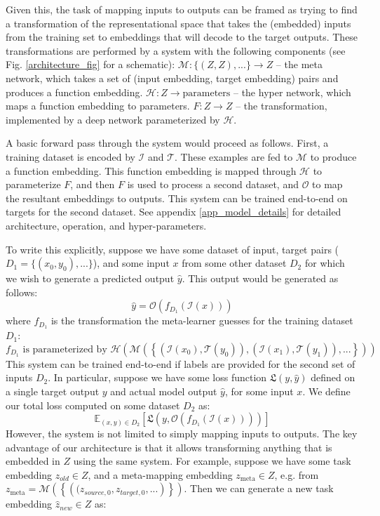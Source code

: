 \documentclass{article}
\begin{document}
Given this, the task of mapping inputs to outputs can be framed as trying to find a transformation of the representational space that takes the (embedded) inputs from the training set to embeddings that will decode to the target outputs. These transformations are performed by a system with the following components (see Fig. \ref{architecture_fig} for a schematic): $\mathcal{M}: \{(Z, Z), ...\} \rightarrow Z $ -- the meta network, which takes a set of (input embedding, target embedding) pairs and produces a function embedding. $\mathcal{H}: Z \rightarrow \text{parameters}$ -- the hyper network, which maps a function embedding to parameters. $F: Z \rightarrow Z$ -- the transformation, implemented by a deep network parameterized by $\mathcal{H}$. \par
A basic forward pass through the system would proceed as follows. First, a training dataset is encoded by $\mathcal{I}$ and $\mathcal{T}$. These examples are fed to $\mathcal{M}$ to produce a function embedding. This function embedding is mapped through $\mathcal{H}$ to parameterize $F$, and then $F$ is used to process a second dataset, and $\mathcal{O}$ to map the resultant embeddings to outputs. This system can be trained end-to-end on targets for the second dataset. See appendix \ref{app_model_details} for detailed architecture, operation, and hyper-parameters. \par 
To write this explicitly, suppose we have some dataset of input, target pairs ($D_1 = \{(x_0, y_0), ...\}$), and some input $x$ from some other dataset $D_2$ for which we wish to generate a predicted output $\hat{y}$. This output would be generated as follows: 
\[\hat{y} = \mathcal{O}\left(f_{D_1}\left(\mathcal{I} \left(x\right)\right) \right)\]
where $f_{D_1}$ is the transformation the meta-learner guesses for the training dataset $D_1$:
\[f_{D_1} \text{ is parameterized by } \mathcal{H}\left(\mathcal{M}\left( \left\{\left(\mathcal{I}\left(x_0\right), \mathcal{T}\left(y_0\right) \right), \left(\mathcal{I}\left(x_1\right), \mathcal{T}\left(y_1\right) \right), ... \right\}\right)\right)\]
This system can be trained end-to-end if labels are provided for the second set of inputs $D_2$. In particular, suppose we have some loss function $\mathfrak{L}(y, \hat{y})$ defined on a single target output $y$ and actual model output $\hat{y}$, for some input $x$. We define our total loss computed on some dataset $D_2$ as:
\[\mathbb{E}_{(x, y)\in {D}_2} \left[ \mathfrak{L}\left(y, \mathcal{O}\left(f_{D_1}\left(\mathcal{I} \left(x\right)\right) \right)\right)\right]\]
However, the system is not limited to simply mapping inputs to outputs. The key advantage of our architecture is that it allows transforming anything that is embedded in $Z$ using the same system. For example, suppose we have some task embedding $z_{old} \in Z$, and a meta-mapping embedding $z_{\text{meta}} \in Z$, e.g. from $z_{\text{meta}} = \mathcal{M}\left( \left\{\left((z_{source,0},z_{target,0}, ...\right) \right\}\right)$. Then we can generate a new task embedding $\hat{z}_{new} \in Z$ as:  
\end{document}
